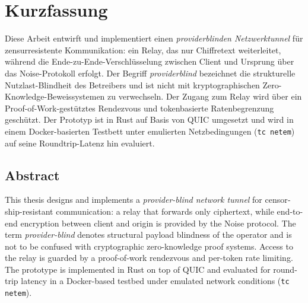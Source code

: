 \documentclass[12pt,a4paper,oneside,bibliography=totoc,listof=totoc,parskip=half]{scrbook}
\begin{document}
\chapter*{Kurzfassung}
Diese Arbeit entwirft und implementiert einen \emph{providerblinden Netzwerktunnel}
für zensurresistente Kommunikation: ein Relay, das nur
Chiffretext weiterleitet, während die Ende-zu-Ende-Verschlüsselung zwischen
Client und Ursprung über das Noise-Protokoll erfolgt. Der Begriff
\emph{providerblind} bezeichnet die strukturelle Nutzlast-Blindheit des Betreibers
und ist nicht mit kryptographischen Zero-Knowledge-Beweissystemen zu verwechseln. Der Zugang zum Relay wird
über ein Proof-of-Work-gestütztes Rendezvous und tokenbasierte Ratenbegrenzung
geschützt. Der Prototyp ist in Rust auf Basis von QUIC umgesetzt und wird in
einem Docker-basierten Testbett unter emulierten Netzbedingungen
(\texttt{tc netem}) auf seine Roundtrip-Latenz hin evaluiert.

\begin{otherlanguage}{english}
\chapter*{Abstract}
This thesis designs and implements a \emph{provider-blind network tunnel} for
censorship-resistant communication: a relay that forwards only
ciphertext, while end-to-end encryption between client and origin is provided by
the Noise protocol. The term \emph{provider-blind} denotes structural payload
blindness of the operator and is not to be confused with cryptographic
zero-knowledge proof systems. Access to the relay is guarded by a proof-of-work
rendezvous and per-token rate limiting. The prototype is implemented in Rust on
top of QUIC and evaluated for round-trip latency in a Docker-based testbed under
emulated network conditions (\texttt{tc netem}).
\end{otherlanguage}

\tableofcontents

\mainmatter









\backmatter
\printbibliography[heading=bibintoc]
\end{document}

